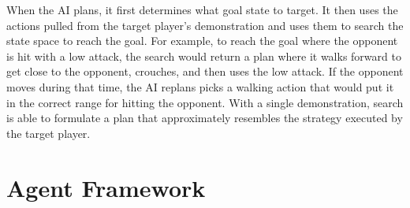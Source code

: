 
When the AI plans, it first determines what goal state to target. It then uses the actions pulled from the target player's demonstration and uses them to search the state space to reach the goal. For example, to reach the goal where the opponent is hit with a low attack, the search would return a plan where it walks forward to get close to the opponent, crouches, and then uses the low attack. If the opponent moves during that time, the AI replans picks a walking action that would put it in the correct range for hitting the opponent. With a single demonstration, search is able to formulate a plan that approximately resembles the strategy executed by the target player.

\section{Agent Framework}

